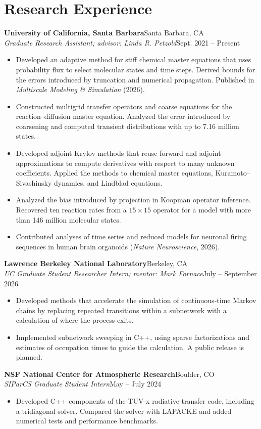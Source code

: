 \documentclass[11pt,letterpaper]{article}
\newcommand{\entry}[4]{\Needspace{4\baselineskip}\textbf{#1}\hfill #2\\\textit{#3}\hfill #4\par}
\begin{document}
\section*{Research Experience}
\entry{University of California, Santa Barbara}{Santa Barbara, CA}
{Graduate Research Assistant; advisor: Linda R. Petzold}{Sept. 2021 -- Present}
\begin{itemize}
\item Developed an adaptive method for stiff chemical master equations that uses probability flux to
select molecular states and time steps. Derived bounds for the errors introduced by truncation and
numerical propagation. Published in \textit{Multiscale Modeling \& Simulation} (2026).
\item Constructed multigrid transfer operators and coarse equations for the reaction--diffusion
master equation. Analyzed the error introduced by coarsening and computed transient distributions
with up to 7.16 million states.
\item Developed adjoint Krylov methods that reuse forward and adjoint approximations to compute
derivatives with respect to many unknown coefficients. Applied the methods to chemical master
equations, Kuramoto--Sivashinsky dynamics, and Lindblad equations.
\item Analyzed the bias introduced by projection in Koopman operator inference. Recovered ten
reaction rates from a $15\times15$ operator for a model with more than 146 million molecular states.
\item Contributed analyses of time series and reduced models for neuronal firing sequences in human
brain organoids (\textit{Nature Neuroscience}, 2026).
\end{itemize}

\entry{Lawrence Berkeley National Laboratory}{Berkeley, CA}
{UC Graduate Student Researcher Intern; mentor: Mark Fornace}{July -- September 2026}
\begin{itemize}
\item Developed methods that accelerate the simulation of continuous-time Markov chains by replacing
repeated transitions within a subnetwork with a calculation of where the process exits.
\item Implemented subnetwork sweeping in C++, using sparse factorizations and estimates of occupation
times to guide the calculation. A public release is planned.
\end{itemize}

\entry{NSF National Center for Atmospheric Research}{Boulder, CO}
{SIParCS Graduate Student Intern}{May -- July 2024}
\begin{itemize}
\item Developed C++ components of the TUV-x radiative-transfer code, including a tridiagonal solver.
Compared the solver with LAPACKE and added numerical tests and performance benchmarks.
\end{itemize}
\end{document}
